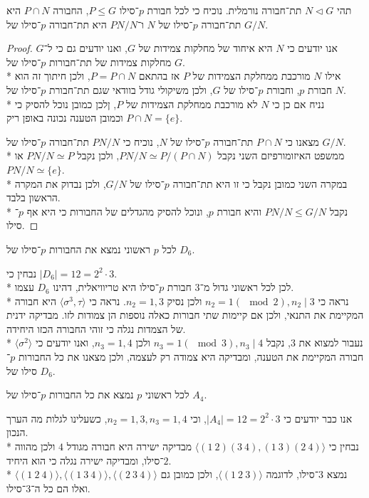 \Subquestion{}
תהי $N \triangleleft G$ תת־חבורה נורמלית. נוכיח כי לכל חבורת $p$־סילו $P \le G$, החבורה $P \cap N$ היא תת־חבורה $p$־סילו של $N$ ו־$PN/N$ היא תת־חבורה $p$־סילו של $G/N$.
\begin{proof}
	אנו יודעים כי $N$ היא איחוד של מחלקות צמידות של $G$, ואנו יודעים גם כי ל־$G$ מחלקות צמידות של תת־חבורות $p$־סילו של $G$. \\*
	אילו $N$ מורכבת ממחלקת הצמידות של $P$ אז בהתאם $P = P \cap N$, ולכן חיתוך זה הוא חבורת $p$, וחבורת $p$־סילו של $G$, ולכן משיקולי גודל בוודאי שגם תת־חבורת $p$־סילו של $N$. \\*
	נניח אם כן כי $N$ לא מורכבת ממחלקת הצמידות של $P$, ןלכן כמובן נוכל להסיק כי $P \cap N = \{ e \}$ וכמובן הטענה נכונה באופן ריק.

	מצאנו כי $P \cap N$ תת־חבורה $p$־סילו של $N$, נוכיח כי $PN / N$ תת־חבורה $p$־סילו של $G / N$. \\*
	ממשפט האיזומורפיזם השני נקבל $PN / N \simeq P / (P \cap N)$, ולכן נקבל $PN / N \simeq P$ או $PN / N \simeq \{ e \}$. \\*
	במקרה השני כמובן נקבל כי זו היא תת־חבורה $p$־סילו של $G/N$, ולכן נבדוק את המקרה הראשון בלבד. \\*
	נקבל $PN / N \le G / N$ והיא חבורת $p$, ונוכל להסיק מהגדלים של החבורות כי היא אף $p$־סילו.
\end{proof}

\Question{}
\Subquestion{}
לכל $p$ ראשוני נמצא את החבורות $p$־סילו של $D_6$.

נבחין כי $|D_6| = 12 = 2^2 \cdot 3$. \\*
לכן לכל ראשוני גדול מ־$3$ חבורת $p$־סילו היא טריוויאלית, דהינו $D_6$ עצמו. \\*
נראה כי $n_2 = 1 (\mod 2), n_2 \mid 3$ ולכן נסיק $n_2 = 1, 3$.
נראה כי $\langle \sigma^3, \tau \rangle$ היא חבורה המקיימת את התנאי, ולכן אם קיימות שתי חבורות כאלה נוספות הן צמודות לזו.
מבדיקה ידנית של הצמדות נגלה כי זוהי החבורה הכזו היחידה. \\*
נעבור למצוא את $3$, נקבל $n_3 = 1 (\mod 3), n_3 \mid 4$ ולכן $n_3 = 1, 4$, ואנו יודעים כי $\langle \sigma^2 \rangle$ חבורה המקיימת את הטענה, ומבדיקה היא צמודה רק לעצמה, ולכן מצאנו את כל החבורות $p$־סילו של $D_6$.

\Subquestion{}
לכל ראשוני $p$ נמצא את כל החבורות $p$־סילו של $A_4$.

אנו כבר יודעים כי $|A_4| = 12 = 2^2 \cdot 3$, וכי $n_2 = 1, 3, n_3 = 1, 4$, כשעלינו לגלות מה הערך הנכון. \\*
נבחין כי $\langle (1\ 2)(3\ 4), (1\ 3)(2\ 4) \rangle$ מבדיקה ישירה היא חבורה מגודל $4$ ולכן מהווה $2$־סילו, ומבדיקה ישירה נגלה כי הוא היחיד. \\*
נמצא $3$־סילו, לדוגמה $\langle (1\ 2\ 3) \rangle$, ולכן כמובן גם $\langle (1\ 2\ 4) \rangle, \langle (1\ 3\ 4) \rangle, \langle (2\ 3\ 4) \rangle$ ואלו הם כל ה־$3$־סילו.

